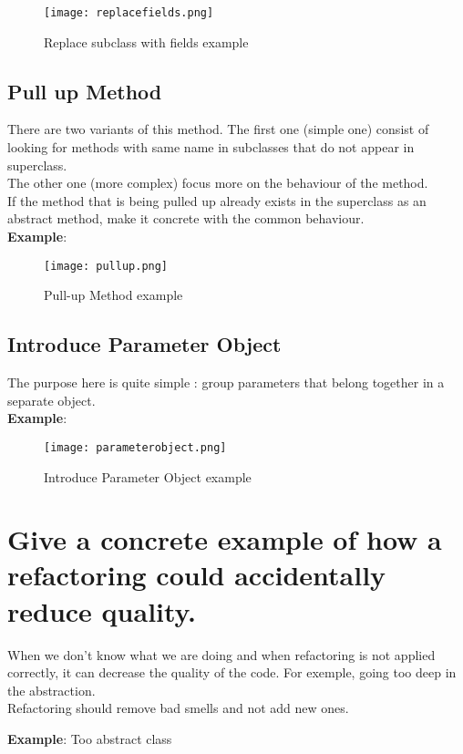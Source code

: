 \begin{figure}[!ht]
\centering
\texttt{[image: replacefields.png]}
\caption{Replace subclass with fields example}
\end{figure}
\FloatBarrier{}

\subsection{Pull up Method}
There are two variants of this method. The first one (simple one) consist of looking for methods with same name in subclasses that do not appear in superclass.\\
The other one (more complex) focus more on the behaviour of the method.\\
If the method that is being pulled up already exists in the superclass as an abstract method, make it
concrete with the common behaviour.
\\
\textbf{Example}:

\begin{figure}[!ht]
\centering
\texttt{[image: pullup.png]}
\caption{Pull-up Method example}
\end{figure}
\FloatBarrier{}

\subsection{Introduce Parameter Object}
The purpose here is quite simple : group parameters that belong together in a separate object.
\\
\textbf{Example}:

\begin{figure}[!ht]
\centering
\texttt{[image: parameterobject.png]}
\caption{Introduce Parameter Object example}
\end{figure}
\FloatBarrier{}


\section{Give a concrete example of how a refactoring could accidentally reduce quality.}

When we don't know what we are doing and when refactoring is not applied correctly, it can decrease the quality of the code. For exemple, going too deep in the abstraction.\\
Refactoring should remove bad smells and not add new ones.

\textbf{Example}: Too abstract class

